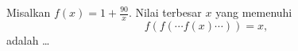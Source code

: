 Misalkan $f(x) = 1 + \frac{90}{x}$. Nilai terbesar $x$ yang memenuhi
\[
f(f(\cdots f(x) \cdots)) = x,
\]
adalah \ldots